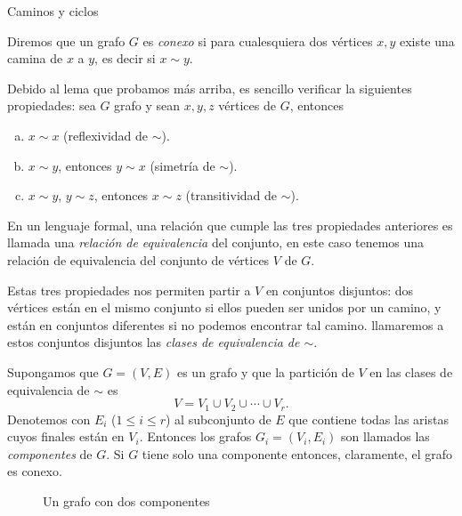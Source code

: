 \begin{section}{Caminos y ciclos}
\begin{definicion} Diremos que un grafo  $G$ es \textit{conexo} si para cualesquiera dos vértices $x,y$ existe una camina de $x$ a $y$, es decir si  $x \sim y$. 
\end{definicion}

Debido al lema que probamos más arriba, es sencillo verificar la siguientes propiedades: sea $G$ grafo y sean $x,y,z$ vértices de $G$, entonces
\begin{enumerate}[a)]
\item $x \sim x$ (reflexividad de $\sim$).
\item $x \sim y$, entonces $y \sim x$ (simetría de $\sim$).
\item $x \sim y$,  $y \sim z$, entonces  $x \sim z$ (transitividad  de $\sim$).
\end{enumerate}


En un lenguaje formal, una relación que  cumple las tres propiedades anteriores es llamada una  {\em relación de equivalencia} del conjunto, en este caso tenemos una relación de equivalencia del conjunto de vértices $V$ de $G$. 

Estas tres propiedades nos permiten partir a $V$ en conjuntos disjuntos: dos vértices están en el mismo conjunto si ellos pueden
ser unidos por un camino, y están en conjuntos diferentes si no podemos encontrar tal camino. llamaremos a estos conjuntos disjuntos las {\em clases de equivalencia de $\sim$}.

\begin{definicion}Supongamos que $G=(V,E)$ es un grafo y
que la partición de $V$ en las clases de equivalencia de $\sim$ es
$$
V= V_1 \cup V_2 \cup \cdots \cup V_r.
$$
Denotemos con $E_i$ ($1\le i \le r$) al subconjunto de $E$ que
contiene todas las aristas cuyos finales están en $V_i$. Entonces
los grafos $G_i=(V_i,E_i)$ son llamados las {\em componentes}    
de $G$. Si $G$ tiene solo una componente entonces, claramente, el grafo es {conexo}.
\end{definicion}



\begin{figure}[t]
	\begin{center}
\end{center}
\caption{Un grafo con dos componentes} \label{f5.6}
\end{figure}


\end{section}

